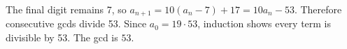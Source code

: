The final digit remains 7, so $a_{n+1}=10(a_n-7)+17=10a_n-53$. Therefore consecutive gcds divide 53. Since $a_0=19\cdot53$, induction shows every term is divisible by 53. The gcd is $\boxed{53}$.
